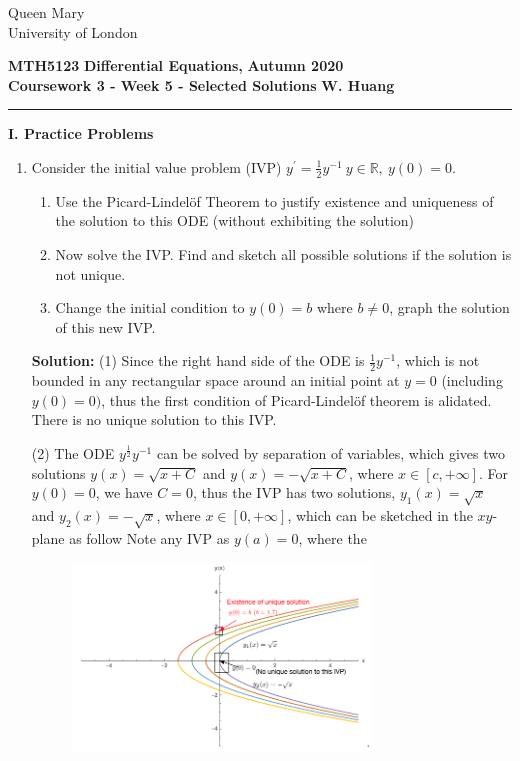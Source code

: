 \documentclass[11pt,a4paper,twoside]{article}
\begin{document}
	\begin{singlespace}
		\begin{center}
			\Huge Queen Mary\\
			\LARGE University of London
		\end{center}
		\Large \textbf{MTH5123} \hfill \Large \textbf{Differential Equations,} \hfill \Large \textbf{Autumn 2020}\\
		\large \textbf{Coursework 3 - Week 5 - Selected Solutions} \hfill \large \textbf{W. Huang}
		\rule{\textwidth}{0.4pt}
	\end{singlespace}
	\textbf{I. Practice Problems}\par
	\begin{enumerate}[\bfseries A.]
		\item Consider the initial value problem (IVP) $y^\prime = \frac{1}{2}y^{-1}\ y\in \mathbb{R},\ y(0) = 0.$
		\begin{enumerate}[\bfseries 1)]
			\item Use the Picard-Lindel\"{o}f Theorem to justify existence and uniqueness of the solution to this ODE (without exhibiting the solution)
			\item Now solve the IVP. Find and sketch all possible solutions if the solution is not unique.
			\item Change the initial condition to $y(0) = b$ where $b \neq 0$, graph the solution of this new IVP.
		\end{enumerate}
		\textbf{Solution:} (1) Since the right hand side of the ODE is $\frac{1}{2}y^{-1}$, which is not bounded in any rectangular space around an initial point at $y = 0$  (including $y(0) = 0)$, thus the first condition of Picard-Lindel\"{o}f theorem is alidated. There is no unique solution to this IVP.\par
		(2) The ODE $y^\frac{1}{2}y^{-1}$ can be solved by separation of variables, which gives two solutions $y(x) = \sqrt{x+C}$ and $y(x) = -\sqrt{x+C}$, where $x \in [c, +\infty]$.  For $y(0) = 0$, we have $C = 0$, thus the IVP has two solutions, $y_1(x) = \sqrt{x}$ and $y_2(x) = -\sqrt{x}$, where $x \in [0, +\infty]$, which can be sketched in the $xy$-plane as follow Note any IVP as $y(a) = 0$, where the
		\begin{figure}[H]
			\centering
				\includegraphics[width=0.75\textwidth]{figure/pdf17.PNG}

\end{figure}
\end{enumerate}
\end{document}
